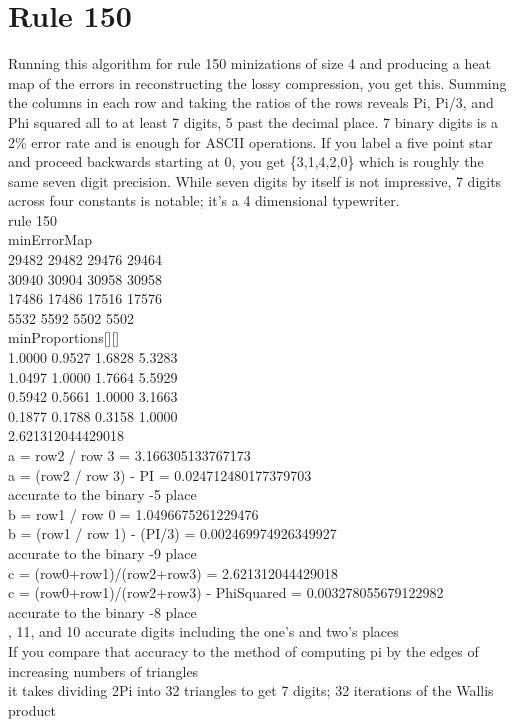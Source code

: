 \documentclass[11pt]{article}
\begin{document}
\section{Rule 150}

Running this algorithm for rule 150 minizations of size 4 and producing a heat map of the errors in reconstructing the lossy compression, you get this. Summing the columns in each row and taking the ratios of the rows reveals Pi, Pi/3, and Phi squared all to at least 7 digits, 5 past the decimal place. 7 binary digits is a 2\% error rate and is enough for ASCII operations. If you label a five point star and proceed backwards starting at 0, you get \{3,1,4,2,0\} which is roughly the same seven digit precision. While seven digits by itself is not impressive, 7 digits across four constants is notable; it's a 4 dimensional typewriter.\\

\noindent rule 150\\

\noindent minErrorMap\\
29482 29482 29476 29464 \\
30940 30904 30958 30958 \\
17486 17486 17516 17576 \\
5532 5592 5502 5502 \\

\noindent minProportions[][]\\
1.0000 0.9527 1.6828 5.3283 \\
1.0497 1.0000 1.7664 5.5929 \\
0.5942 0.5661 1.0000 3.1663 \\
0.1877 0.1788 0.3158 1.0000 \\
2.621312044429018\\

\noindent a = row2 / row 3 = 3.166305133767173\\
a = (row2 / row 3) - PI = 0.024712480177379703\\
accurate to the binary -5 place\\

\noindent b = row1 / row 0 = 1.0496675261229476\\
b = (row1 / row 1) - (PI/3) = 0.002469974926349927\\
accurate to the binary -9 place\\

\noindent c = (row0+row1)/(row2+row3) = 2.621312044429018\\
c = (row0+row1)/(row2+row3) - PhiSquared = 0.003278055679122982\\
accurate to the binary -8 place\\

, 11, and 10 accurate digits including the one's and two's places\\
If you compare that accuracy to the method of computing pi by the edges of increasing numbers of triangles\\
it takes dividing 2Pi into 32 triangles to get 7 digits; 32 iterations of the Wallis product\\



\end{document}
